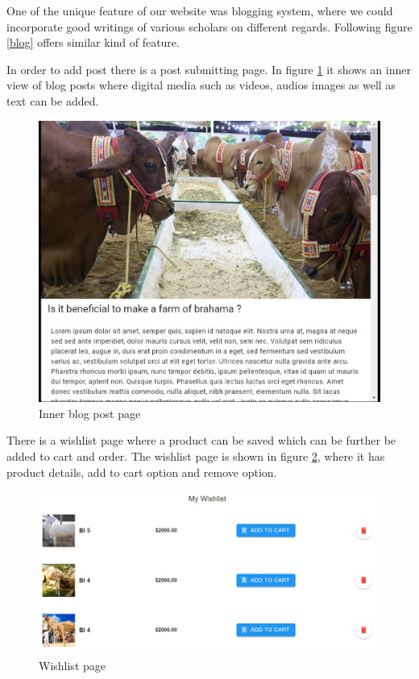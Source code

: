 \documentclass[a4paper,12pt]{report}
\begin{document}
One of the unique feature of our website was blogging system, where we could incorporate good writings of various scholars on different regards. Following figure \ref{blog} offers similar kind of feature.


In order to add post there is a post submitting page. In figure \ref{post} it shows an inner view of blog posts where digital media such as videos, audios images as well as text can be added.
\begin{figure}[H]
\centering
\includegraphics[keepaspectratio, width=12cm]{blogpost.jpg}
\caption{Inner blog post page}
\label{post}
\end{figure}

There is a wishlist page where a product can be saved which can be further be added to cart and order. The wishlist page is shown in figure \ref{wlst}, where it has product details, add to cart option and remove option.
\begin{figure}[H]
\centering
\includegraphics[keepaspectratio, width=12cm]{wishlist.jpg}
\caption{Wishlist page}
\label{wlst}
\end{figure}
\end{document}
